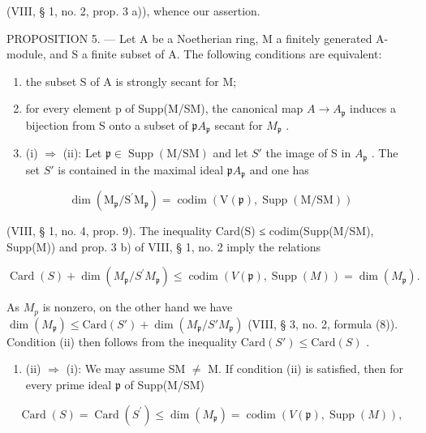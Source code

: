 (VIII, § 1, no. 2, prop. 3 a)), whence our assertion.

PROPOSITION 5. --- Let A be a Noetherian ring, M a finitely generated A-module, and S a finite subset of A. The following conditions are equivalent:

\begin{enumerate}
\def\labelenumi{(\roman{enumi})}
\item
  the subset S of A is strongly secant for M;
\item
  for every element p of Supp(M/SM), the canonical map \(A \to A_{\mathfrak{p}}\) induces a bijection from S onto a subset of \(\mathfrak{p}A_{\mathfrak{p}}\) secant for \(M_{\mathfrak{p}}\) .
\item
  (i) \(\Rightarrow\) (ii): Let \(\mathfrak{p} \in \operatorname{Supp}(\mathrm{M} / \mathrm{SM})\) and let \(S'\) the image of S in \(A_{\mathfrak{p}}\) . The set \(S'\) is contained in the maximal ideal \(\mathfrak{p} A_{\mathfrak{p}}\) and one has
\end{enumerate}

\[
\dim (\mathrm{M} _ {\mathfrak {p}} / \mathrm{S} ^ {\prime} \mathrm{M} _ {\mathfrak {p}}) = \operatorname{codim} (\mathrm{V} (\mathfrak {p}), \operatorname{Supp} (\mathrm{M} / \mathrm{SM}))
\]

(VIII, § 1, no. 4, prop. 9). The inequality Card(S) ≤ codim(Supp(M/SM), Supp(M)) and prop. 3 b) of VIII, § 1, no. 2 imply the relations

\[
\operatorname{Card} (S) + \dim \left(M _ {\mathfrak {p}} / S ^ {\prime} M _ {\mathfrak {p}}\right) \leqslant \operatorname{codim} \left(V (\mathfrak {p}), \operatorname{Supp} (M)\right) = \dim \left(M _ {\mathfrak {p}}\right).
\]

As \(M_{p}\) is nonzero, on the other hand we have \(\dim(M_{\mathfrak{p}}) \leqslant \text{Card}(S') + \dim(M_{\mathfrak{p}}/S'M_{\mathfrak{p}})\) (VIII, § 3, no. 2, formula (8)). Condition (ii) then follows from the inequality \(\text{Card}(S') \leqslant \text{Card}(S)\) .

\begin{enumerate}
\def\labelenumi{(\roman{enumi})}
\setcounter{enumi}{1}
\tightlist
\item
  (ii) \(\Rightarrow\) (i): We may assume SM \(\neq\) M. If condition (ii) is satisfied, then for every prime ideal \(\mathfrak{p}\) of Supp(M/SM)
\end{enumerate}

\[
\operatorname{Card} (S) = \operatorname{Card} \left(S ^ {\prime}\right) \leqslant \dim \left(M _ {\mathfrak {p}}\right) = \operatorname{codim} (V (\mathfrak {p}), \operatorname{Supp} (M)),
\]

